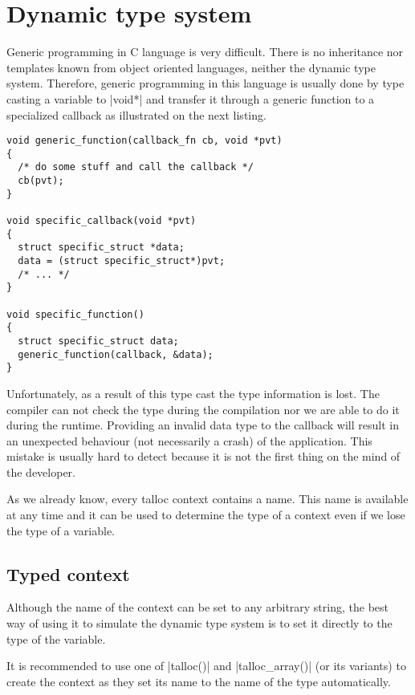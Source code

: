 \section{Dynamic type system}
\label{talloc:dyn-ts}

Generic programming in C language is very difficult. There is no inheritance nor
templates known from object oriented languages, neither the dynamic type system.
Therefore, generic programming in this language is usually done by type casting
a variable to |void*| and transfer it through a generic function to a specialized
callback as illustrated on the next listing.

\begin{lstlisting}[caption={Generic programming pattern},label=lst-generic-prg]
void generic_function(callback_fn cb, void *pvt)
{
  /* do some stuff and call the callback */
  cb(pvt);
}

void specific_callback(void *pvt)
{
  struct specific_struct *data;
  data = (struct specific_struct*)pvt;
  /* ... */
}

void specific_function()
{
  struct specific_struct data;
  generic_function(callback, &data);
}
\end{lstlisting}

Unfortunately, as a result of this type cast the type information is lost. The
compiler can not check the type during the compilation nor we are able to do it
during the runtime. Providing an invalid data type to the callback will result
in an unexpected behaviour (not necessarily a crash) of the application. This
mistake is usually hard to detect because it is not the first thing on the mind
of the developer.

As we already know, every talloc context contains a name. This name is available
at any time and it can be used to determine the type of a context even if we
lose the type of a variable.

\subsection{Typed context}

Although the name of the context can be set to any arbitrary string, the best
way of using it to simulate the dynamic type system is to set it directly to the
type of the variable.

It is recommended to use one of |talloc()| and |talloc_array()| (or its
variants) to create the context as they set its name to the name of the type
automatically.

